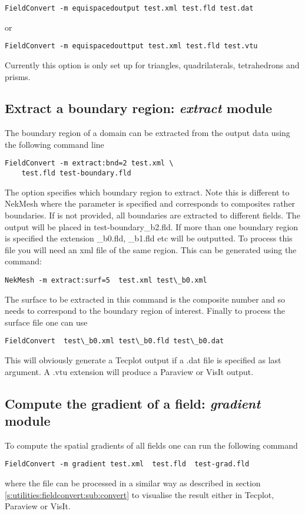 \begin{lstlisting}[style=BashInputStyle]
FieldConvert -m equispacedoutput test.xml test.fld test.dat
\end{lstlisting}

or

\begin{lstlisting}[style=BashInputStyle]
FieldConvert -m equispacedouttput test.xml test.fld test.vtu
\end{lstlisting}


\begin{notebox}
Currently this option is only set up for triangles, quadrilaterals,
tetrahedrons and prisms.
\end{notebox}

\subsection{Extract a boundary region: \textit{extract} module}
The boundary region of a domain can be extracted from the output
data using the following command line
%
\begin{lstlisting}[style=BashInputStyle]
FieldConvert -m extract:bnd=2 test.xml \
	test.fld test-boundary.fld
\end{lstlisting}
%
The option  specifies which boundary region to extract.
Note this is different to NekMesh where the parameter \inltt{surf}
is specified and corresponds to composites rather boundaries. If 
is not provided, all boundaries are extracted to different fields.
The output will be placed in test-boundary\_b2.fld.
If more than one boundary region is specified the extension \_b0.fld, \_b1.fld etc will be
outputted. To process this file you will need an xml file of the same region.
This can be generated using the command:
%
\begin{lstlisting}[style=BashInputStyle]
NekMesh -m extract:surf=5  test.xml test\_b0.xml
\end{lstlisting}
%
The surface to be extracted in this command is the composite
number and so needs to correspond to the boundary region
of interest. Finally to process the surface file one can use
%
\begin{lstlisting}[style=BashInputStyle]
FieldConvert  test\_b0.xml test\_b0.fld test\_b0.dat
\end{lstlisting}
%
This will obviously generate a Tecplot output if a .dat file
is specified as last argument. A .vtu extension will produce
a Paraview or VisIt output.
%
%
%
\subsection{Compute the gradient of a field: \textit{gradient} module}
To compute the spatial gradients of all fields one can run the following command
%
\begin{lstlisting}[style=BashInputStyle]
FieldConvert -m gradient test.xml  test.fld  test-grad.fld
\end{lstlisting}
%
where the file  can be processed in a similar
way as described in section \ref{s:utilities:fieldconvert:sub:convert}
to visualise the result either in Tecplot, Paraview or VisIt.
%
%

